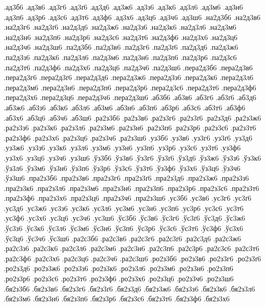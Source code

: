 {%
%
%
.ад3б6
.ад3в6
.ад3г6
.ад3ґ6
.ад3д6
.ад3ж6
.ад3з6
.ад3к6
.ад3л6
.ад3м6
.ад3н6
.ад3п6
.ад3р6
.ад3с6
.ад3т6
.ад3ф6
.ад3х6
.ад3ц6
.ад3ч6
.ад3ш6
.на2д3б6
.на2д3в6
.на2д3г6
.на2д3ґ6
.на2д3д6
.на2д3ж6
.на2д3з6
.на2д3к6
.на2д3л6
.на2д3м6
.на2д3н6
.на2д3п6
.на2д3р6
.на2д3с6
.на2д3т6
.на2д3ф6
.на2д3х6
.на2д3ц6
.на2д3ч6
.на2д3ш6
.па2д3б6
.па2д3в6
.па2д3г6
.па2д3ґ6
.па2д3д6
.па2д3ж6
.па2д3з6
.па2д3к6
.па2д3л6
.па2д3м6
.па2д3н6
.па2д3п6
.па2д3р6
.па2д3с6
.па2д3т6
.па2д3ф6
.па2д3х6
.па2д3ц6
.па2д3ч6
.па2д3ш6
.пера2д3б6
.пера2д3в6
.пера2д3г6
.пера2д3ґ6
.пера2д3д6
.пера2д3ж6
.пера2д3з6
.пера2д3к6
.пера2д3л6
.пера2д3м6
.пера2д3н6
.пера2д3п6
.пера2д3р6
.пера2д3с6
.пера2д3т6
.пера2д3ф6
.пера2д3х6
.пера2д3ц6
.пера2д3ч6
.пера2д3ш6
.аб3б6
.аб3в6
.аб3г6
.аб3ґ6
.аб3д6
.аб3ж6
.аб3з6
.аб3к6
.аб3л6
.аб3м6
.аб3н6
.аб3п6
.аб3р6
.аб3с6
.аб3т6
.аб3ф6
.аб3х6
.аб3ц6
.аб3ч6
.аб3ш6
.ра2з3б6
.ра2з3в6
.ра2з3г6
.ра2з3ґ6
.ра2з3д6
.ра2з3ж6
.ра2з3з6
.ра2з3к6
.ра2з3л6
.ра2з3м6
.ра2з3н6
.ра2з3п6
.ра2з3р6
.ра2з3с6
.ра2з3т6
.ра2з3ф6
.ра2з3х6
.ра2з3ц6
.ра2з3ч6
.ра2з3ш6
.уз3б6
.уз3в6
.уз3г6
.уз3ґ6
.уз3д6
.уз3ж6
.уз3з6
.уз3к6
.уз3л6
.уз3м6
.уз3н6
.уз3п6
.уз3р6
.уз3с6
.уз3т6
.уз3ф6
.уз3х6
.уз3ц6
.уз3ч6
.уз3ш6
.ўз3б6
.ўз3в6
.ўз3г6
.ўз3ґ6
.ўз3д6
.ўз3ж6
.ўз3з6
.ўз3к6
.ўз3л6
.ўз3м6
.ўз3н6
.ўз3п6
.ўз3р6
.ўз3с6
.ўз3т6
.ўз3ф6
.ўз3х6
.ўз3ц6
.ўз3ч6
.ўз3ш6
.пра2з3б6
.пра2з3в6
.пра2з3г6
.пра2з3ґ6
.пра2з3д6
.пра2з3ж6
.пра2з3з6
.пра2з3к6
.пра2з3л6
.пра2з3м6
.пра2з3н6
.пра2з3п6
.пра2з3р6
.пра2з3с6
.пра2з3т6
.пра2з3ф6
.пра2з3х6
.пра2з3ц6
.пра2з3ч6
.пра2з3ш6
.ус3б6
.ус3в6
.ус3г6
.ус3ґ6
.ус3д6
.ус3ж6
.ус3з6
.ус3к6
.ус3л6
.ус3м6
.ус3н6
.ус3п6
.ус3р6
.ус3с6
.ус3т6
.ус3ф6
.ус3х6
.ус3ц6
.ус3ч6
.ус3ш6
.ўс3б6
.ўс3в6
.ўс3г6
.ўс3ґ6
.ўс3д6
.ўс3ж6
.ўс3з6
.ўс3к6
.ўс3л6
.ўс3м6
.ўс3н6
.ўс3п6
.ўс3р6
.ўс3с6
.ўс3т6
.ўс3ф6
.ўс3х6
.ўс3ц6
.ўс3ч6
.ўс3ш6
.ра2с3б6
.ра2с3в6
.ра2с3г6
.ра2с3ґ6
.ра2с3д6
.ра2с3ж6
.ра2с3з6
.ра2с3к6
.ра2с3л6
.ра2с3м6
.ра2с3н6
.ра2с3п6
.ра2с3р6
.ра2с3с6
.ра2с3т6
.ра2с3ф6
.ра2с3х6
.ра2с3ц6
.ра2с3ч6
.ра2с3ш6
.ро2з3б6
.ро2з3в6
.ро2з3г6
.ро2з3ґ6
.ро2з3д6
.ро2з3ж6
.ро2з3з6
.ро2з3к6
.ро2з3л6
.ро2з3м6
.ро2з3н6
.ро2з3п6
.ро2з3р6
.ро2з3с6
.ро2з3т6
.ро2з3ф6
.ро2з3х6
.ро2з3ц6
.ро2з3ч6
.ро2з3ш6
.бя2з3б6
.бя2з3в6
.бя2з3г6
.бя2з3ґ6
.бя2з3д6
.бя2з3ж6
.бя2з3з6
.бя2з3к6
.бя2з3л6
.бя2з3м6
.бя2з3н6
.бя2з3п6
.бя2з3р6
.бя2з3с6
.бя2з3т6
.бя2з3ф6
.бя2з3х6
}
